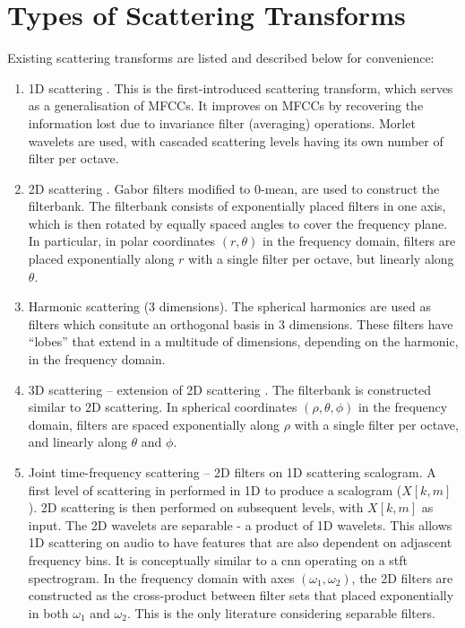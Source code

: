 \section{Types of Scattering Transforms}
Existing scattering transforms are listed and described below for convenience:
\begin{enumerate}
    \item 1D scattering \citep{1dscattering1, ws}. This is the first-introduced scattering transform, which serves as a generalisation of MFCCs. It improves on MFCCs by recovering the information lost due to invariance filter (averaging) operations. Morlet wavelets are used, with cascaded scattering levels having its own number of filter per octave.
    \item 2D scattering \citep{2dscattering}. Gabor filters modified to 0-mean, are used to construct the filterbank. The filterbank consists of exponentially placed filters in one axis, which is then rotated by equally spaced angles to cover the frequency plane. In particular, in polar coordinates $(r, \theta)$ in the frequency domain, filters are placed exponentially along $r$ with a single filter per octave, but linearly along $\theta$.
    \item Harmonic scattering \citep{harmonicscattering} (3 dimensions). The spherical harmonics are used as filters which consitute an orthogonal basis in 3 dimensions. These filters have ``lobes'' that extend in a multitude of dimensions, depending on the harmonic, in the frequency domain.
    \item 3D scattering -- extension of 2D scattering \citep{3dscattering}. The filterbank is constructed similar to 2D scattering. In spherical coordinates $(\rho, \theta, \phi)$ in the frequency domain, filters are spaced exponentially along $\rho$ with a single filter per octave, and linearly along $\theta$ and $\phi$.
    \item Joint time-frequency \citep{ws_joint_tf,jointtfscattering2} scattering -- 2D filters on 1D scattering scalogram. A first level of scattering in performed in 1D to produce a scalogram ($X[k, m]$). 2D scattering is then performed on subsequent levels, with $X[k, m]$ as input. The 2D wavelets are separable - a product of 1D wavelets. This allows 1D scattering on audio to have features that are also dependent on adjascent frequency bins. It is conceptually similar to a \ac{cnn} operating on a \ac{stft} spectrogram. In the frequency domain with axes $(\omega_1, \omega_2)$, the 2D filters are constructed as the cross-product between filter sets that placed exponentially in both $\omega_1$ and $\omega_2$.
    This is the only literature considering separable filters.
\end{enumerate}

